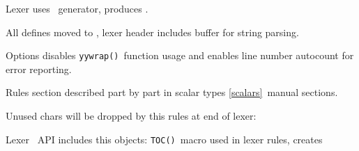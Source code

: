\label{lexer}

Lexer uses \ generator, produces .
\bigskip

All defines moved to , lexer header includes
buffer for string parsing.


Options disables \verb|yywrap()|\ function usage and enables line number
autocount for error reporting.


Rules section described part by part in scalar types \ref{scalars}\ manual
sections.


Unused chars will be dropped by this rules at end of lexer:


Lexer \cpp\ API includes this objects: \verb|TOC()|\ macro used in lexer rules,
creates 


